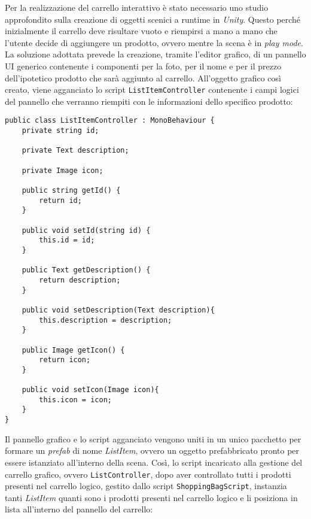 Per la realizzazione del carrello interattivo è stato necessario uno studio approfondito sulla creazione di oggetti scenici a runtime in \textit{Unity}. Questo perché inizialmente il carrello deve risultare vuoto e riempirsi a mano a mano che l'utente decide di aggiungere un prodotto, ovvero mentre la scena è in \textit{play mode}. \\ 
La soluzione adottata prevede la creazione, tramite l'editor grafico, di un pannello UI generico contenente i componenti per la foto, per il nome e per il prezzo dell'ipotetico prodotto che sarà aggiunto al carrello. All'oggetto grafico così creato, viene agganciato lo script \texttt{ListItemController} contenente i campi logici del pannello che verranno riempiti con le informazioni dello specifico prodotto: 

\begin{lstlisting}[style=MyCStyle]
public class ListItemController : MonoBehaviour {
	private string id;

	private Text description;

	private Image icon;

	public string getId() {
		return id;
	}

	public void setId(string id) {
		this.id = id;
	}
	
	public Text getDescription() {
		return description;
	}
	
	public void setDescription(Text description){
		this.description = description;
	}
	
	public Image getIcon() {
		return icon;
	}
		
	public void setIcon(Image icon){
		this.icon = icon;
	}
}
\end{lstlisting}

Il pannello grafico e lo script agganciato vengono uniti in un unico pacchetto per formare un \textit{prefab} di nome \textit{ListItem}, ovvero un oggetto prefabbricato pronto per essere istanziato all'interno della scena. Così, lo script incaricato alla gestione del carrello grafico, ovvero \texttt{ListController}, dopo aver controllato tutti i prodotti presenti nel carrello logico, gestito dallo script \texttt{ShoppingBagScript}, instanzia tanti \textit{ListItem} quanti sono i prodotti presenti nel carrello logico e li posiziona in lista all'interno del pannello del carrello:

